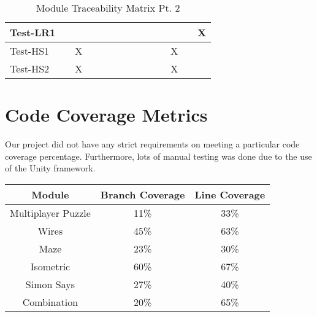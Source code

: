 \documentclass[12pt, titlepage]{article}
\begin{document}
\begin{table}[H]
\begin{adjustwidth}{-0.3in}{-0.5in}
{\begin{tabular}{c|c|c|c|c|c|c|c|c|c|c|c|c|c|}
\multicolumn{1}{|l|}{{Test-LR1}}   &             &             &             &             &             &             &             &             &              &              &                           &  & X                   \\ \hline
\multicolumn{1}{|l|}{{Test-HS1}}   &             &          X   &             &             &             &             &             &             &              &              &                           X&  &                    \\ \hline
\multicolumn{1}{|l|}{{Test-HS2}}   &             &          X   &             &             &             &             &             &             &              &              &                           X&  &                    \\ \hline
\end{tabular}}
\caption{Module Traceability Matrix Pt. 2}
    \label{tab:matrix5}
\end{adjustwidth}
\end{table}

\section{Code Coverage Metrics}
Our project did not have any strict requirements on meeting a particular code coverage percentage. Furthermore, lots of manual testing was done due to the use of the Unity framework.

\begin{table}[H]
\begin{tabular}{|c|c|c|}
\hline
\textbf{Module} & \textbf{Branch Coverage} & \textbf{Line Coverage} \\ \hline
     Multiplayer Puzzle           &     11\%                     &     33\%                   \\ \hline
        Wires        &       45\%                   &            63\%            \\ \hline
        Maze        &       23\%                   &            30\%            \\ \hline
        Isometric        &       60\%                   &            67\%            \\ \hline
        Simon Says        &       27\%                   &            40\%            \\ \hline
        Combination        &       20\%                   &            65\%            \\ \hline
\end{tabular}
\end{table}
\end{document}
